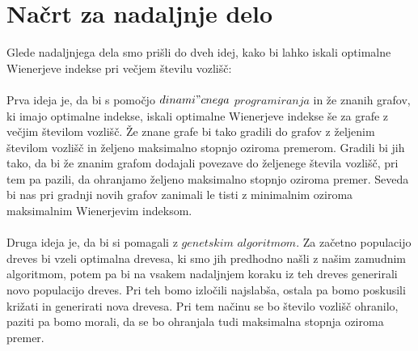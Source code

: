 \documentclass[a4paper]{article}
\begin{document}
\section{Načrt za nadaljnje delo}

Glede nadaljnjega dela smo prišli do dveh idej, kako bi lahko iskali optimalne Wienerjeve indekse pri večjem številu vozlišč:
\\
\\
Prva ideja je, da bi s pomočjo $dinami"cnega$ $programiranja$ in že znanih grafov, ki imajo optimalne indekse,
iskali optimalne Wienerjeve indekse še za grafe z večjim številom vozlišč. Že znane grafe bi tako gradili do grafov 
z željenim številom vozlišč in željeno maksimalno stopnjo oziroma premerom. Gradili bi jih tako, da bi že znanim 
grafom dodajali povezave do željenege števila vozlišč, pri tem pa pazili, da ohranjamo željeno maksimalno stopnjo 
oziroma premer. Seveda bi nas pri gradnji novih grafov zanimali le tisti z minimalnim oziroma maksimalnim Wienerjevim indeksom.
\\
\\
Druga ideja je, da bi si pomagali z $genetskim$ $algoritmom$.  Za začetno populacijo dreves bi vzeli optimalna drevesa,
ki smo jih predhodno našli z našim zamudnim algoritmom, potem pa bi na vsakem nadaljnjem koraku iz teh dreves 
generirali novo populacijo dreves. Pri teh bomo izločili najslabša, ostala pa bomo poskusili križati in generirati nova drevesa.
Pri tem načinu se bo število vozlišč ohranilo, paziti pa bomo morali, da se bo ohranjala tudi maksimalna stopnja oziroma premer.
\end{document}

